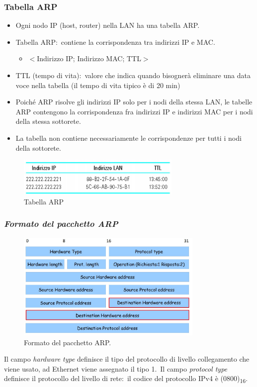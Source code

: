\pagebreak

\subsubsection{Tabella ARP}

\begin{itemize}
    \item Ogni nodo IP (host, router) nella LAN ha una tabella ARP.
    \item Tabella ARP:\ contiene la corrispondenza tra indirizzi IP e MAC.
          \begin{itemize}
              \item $<$Indirizzo IP; Indirizzo MAC; TTL$>$
          \end{itemize}
    \item TTL (tempo di vita):\ valore che indica quando bisognerà eliminare una data voce nella tabella (il tempo di vita tipico è di 20 min)
    \item Poiché ARP risolve gli indirizzi IP solo per i nodi della stessa LAN, le tabelle ARP contengono la corrispondenza fra indirizzi IP e indirizzi MAC per i nodi della stessa sottorete.
    \item La tabella non contiene necessariamente le corrispondenze per tutti i nodi della sottorete.
\end{itemize}

\begin{figure}[H]
    \centering
    \includegraphics[width=0.7\textwidth]{immagini/ARP_Tabella.jpg}
    \caption*{Tabella ARP}
\end{figure}

\subsubsection{\emph{Formato del pacchetto ARP}}

\begin{figure}[H]
    \centering
    \includegraphics[width=0.8\textwidth]{immagini/Pacchetto_ARP.jpg}
    \caption*{Formato del pacchetto ARP.}
\end{figure}
Il campo \emph{hardware type} definisce il tipo del protocollo di livello collegamento che viene usato, ad Ethernet viene assegnato il tipo 1.\
Il campo \emph{protocol type} definisce il protocollo del livello di rete:\ il codice del protocollo IPv4 è (0800)\textsubscript{16}.

